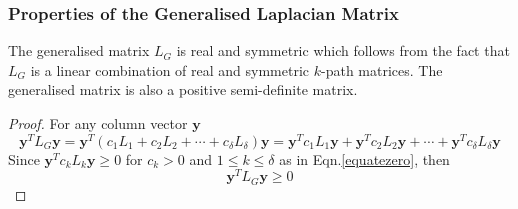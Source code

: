\documentclass[10pt,a4paper]{article}
\begin{document}
		    \subsubsection{Properties of the Generalised Laplacian Matrix }
		    The generalised matrix $L_G$ is real and symmetric which follows from the fact that $L_G$ is a linear combination of real and symmetric $k$-path matrices. The generalised matrix is also a positive semi-definite matrix. 
		    \begin{proof}
		    	For any column vector $\mathbf{y}$
		    	\begin{equation}
		    	\mathbf{y}^T L_{G} \mathbf{y} = \mathbf{y}^T(c_{1}L_{1} + c_{2}L_{2} + \cdots + c_{\delta}L_{\delta} )\mathbf{y}
		    	= \mathbf{y}^Tc_{1}L_{1}\mathbf{y} + \mathbf{y}^Tc_{2}L_{2}\mathbf{y} + \cdots + \mathbf{y}^Tc_{\delta}L_{\delta}\mathbf{y} 
		    	\end{equation}
		    	Since $\mathbf{y}^Tc_{k}L_{k}\mathbf{y} \geq 0$ for $c_{k}>0$ and $1 \leq k \leq \delta$ as in Eqn.\ref{equatezero}, then
		    	\begin{equation}
		    	\mathbf{y}^T L_{G} \mathbf{y} \geq 0	
		    	\end{equation}
		    \end{proof}
	    
\end{document}
